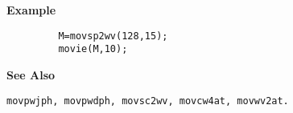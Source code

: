 {\bf \large {}\selectfont Example}
\begin{verbatim}
         M=movsp2wv(128,15); 
         movie(M,10);
\end{verbatim}
\vspace*{.5cm}


{\bf \large {}\selectfont See Also}\\
\hspace*{1.5cm}
\begin{minipage}[t]{13.5cm}
\begin{verbatim}
movpwjph, movpwdph, movsc2wv, movcw4at, movwv2at.
\end{verbatim}
\end{minipage}
